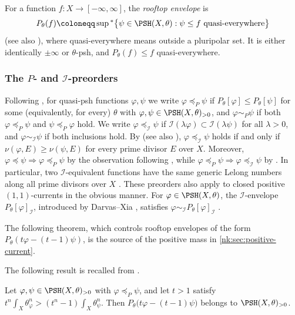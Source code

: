 For a function $f\colon X\to[-\infty,\infty]$, the \emph{rooftop
envelope} is
\[
  P_\theta(f)\coloneqq \sup{}^*\bigl\{\psi\in\PSH(X,\theta):
     \psi\le f\ \text{quasi-everywhere}\bigr\}
\]
\cite[Definition~2.4.1]{SGPT} (see also \cite{RWN14,DDNL18mono}),
where quasi-everywhere means outside a
pluripolar set. It is either identically $\pm\infty$ or $\theta$-psh, and
$P_\theta(f)\le f$ quasi-everywhere.

\subsubsection*{The \texorpdfstring{$P$}{P}- and
\texorpdfstring{$\mathcal I$}{I}-preorders}
Following \cite[Definition~6.1.1]{SGPT}, for quasi-psh functions
$\varphi,\psi$ we write $\varphi\preceq_P\psi$ if
$P_\theta[\varphi]\le P_\theta[\psi]$ for some (equivalently, for every)
$\theta$ with $\varphi,\psi\in\PSH(X,\theta)_{>0}$, and
$\varphi\sim_P\psi$ if both $\varphi\preceq_P\psi$ and $\psi\preceq_P\varphi$
hold. We write $\varphi\preceq_{\mathcal I}\psi$ if
$\mathcal I(\lambda\varphi)\subset\mathcal I(\lambda\psi)$ for all $\lambda>0$, and
$\varphi\sim_{\mathcal I}\psi$ if both inclusions hold. By
\cite[Proposition~6.1.2]{SGPT} (see also \cite{BFJ08}),
$\varphi\preceq_{\mathcal I}\psi$ holds if and only if
$\nu(\varphi,E)\ge\nu(\psi,E)$ for every prime divisor $E$ over
$X$. Moreover,
$\varphi\preceq\psi\Rightarrow\varphi\preceq_P\psi$ by the observation
following \cite[Definition~6.1.1]{SGPT}, while
$\varphi\preceq_P\psi\Rightarrow\varphi\preceq_{\mathcal I}\psi$ by
\cite[Corollary~6.1.1]{SGPT}. In particular, two
$\mathcal I$-equivalent functions have the same generic Lelong numbers along all
prime divisors over $X$ \cite[Proposition~3.2.1]{SGPT}. 
These preorders also apply to closed positive $(1,1)$-currents in the obvious manner.
For
$\varphi\in\PSH(X,\theta)$, the $\mathcal I$-envelope
$P_\theta[\varphi]_{\mathcal I}$, introduced by Darvas--Xia \cite{DX22},
satisfies $\varphi\sim_{\mathcal I} P_\theta[\varphi]_\mathcal I$
\cite[Proposition~3.2.6]{SGPT}.

The following theorem, which controls rooftop envelopes of the form
$P_\theta(t\varphi-(t-1)\psi)$, is the source of the positive mass in
\cref{nk:sec:positive-current}.

The following result is recalled from \cite[Theorem~6.1.1]{SGPT}.

\begin{theorem}\label{nk:thm:rooftop}
Let $\varphi,\psi\in\PSH(X,\theta)_{>0}$ with $\varphi\preceq_P\psi$, and
let $t>1$ satisfy
$t^n\int_X\theta_\varphi^n>(t^n-1)\int_X\theta_\psi^n$. Then
$P_\theta\bigl(t\varphi-(t-1)\psi\bigr)$ belongs to
$\PSH(X,\theta)_{>0}$.
\end{theorem}

